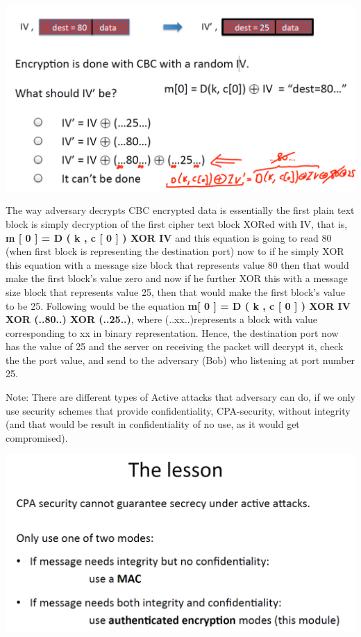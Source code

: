 \documentclass[11pt]{article}
\makeatletter
\def\maxwidth{\ifdim\Gin@nat@width>\linewidth\linewidth
    \else\Gin@nat@width\fi}
\let\Oldincludegraphics\includegraphics
\renewcommand{\includegraphics}[1]{\Oldincludegraphics[width=.8\maxwidth]{#1}}
\makeatother
\begin{document}
\includegraphics{./Images/ModifyingPortAddress.png}

The way adversary decrypts CBC encrypted data is essentially the first
plain text block is simply decryption of the first cipher text block
XORed with IV, that is, \textbf{m {[} 0 {]} = D ( k , c {[} 0 {]} ) XOR
IV} and this equation is going to read 80 (when first block is
representing the destination port) now to if he simply XOR this equation
with a message size block that represents value 80 then that would make
the first block's value zero and now if he further XOR this with a
message size block that represents value 25, then that would make the
first block's value to be 25. Following would be the equation
\textbf{m{[} 0 {]} = D ( k , c {[} 0 {]} ) XOR IV XOR (..80..) XOR
(..25..)}, where (..xx..)represents a block with value corresponding to
xx in binary representation. Hence, the destination port now has the
value of 25 and the server on receiving the packet will decrypt it,
check the the port value, and send to the adversary (Bob) who listening
at port number 25.

Note: There are different types of Active attacks that adversary can do,
if we only use security schemes that provide confidentiality,
CPA-security, without integrity (and that would be result in
confidentiality of no use, as it would get compromised).

\includegraphics{./Images/LessonFromAttack-AuthEncryp.png}
\end{document}
